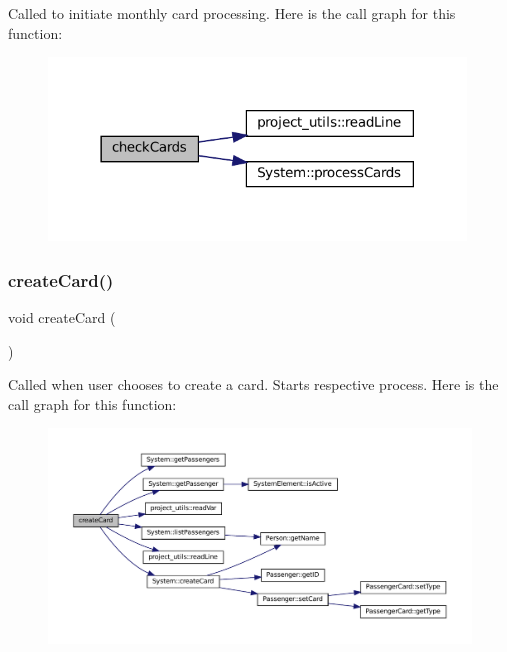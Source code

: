 Called to initiate monthly card processing. Here is the call graph for this function\+:
\nopagebreak
\begin{figure}[H]
\begin{center}
\leavevmode
\includegraphics[width=314pt]{Train-System_8cpp_acc3a8510afc936d345b1330b79a4cf13_cgraph}
\end{center}
\end{figure}
\mbox{\label{Train-System_8cpp_a046f15f0d2069f268cd2f818cac53ccf}} 
\subsubsection{\texorpdfstring{create\+Card()}{createCard()}}
{\footnotesize\ttfamily void create\+Card (\begin{DoxyParamCaption}{ }\end{DoxyParamCaption})}

Called when user chooses to create a card. Starts respective process. Here is the call graph for this function\+:
\nopagebreak
\begin{figure}[H]
\begin{center}
\leavevmode
\includegraphics[width=350pt]{Train-System_8cpp_a046f15f0d2069f268cd2f818cac53ccf_cgraph}
\end{center}
\end{figure}
\mbox{\label{Train-System_8cpp_a5dc3267477bbb266c4465f2a1ac03acd}} 
